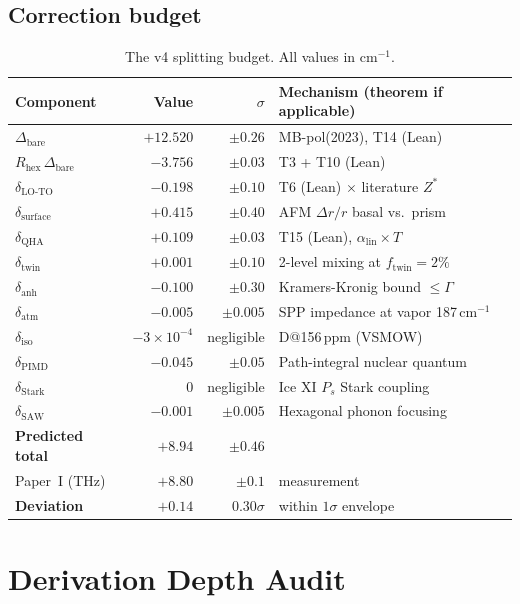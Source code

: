 \documentclass[11pt,a4paper]{article}
\begin{document}
\subsection{Correction budget}

\begin{table}[h]
\centering
\caption{The v4 splitting budget. All values in cm$^{-1}$.}
\label{tab:budget}
\small
\begin{tabular}{lrrl}
\toprule
Component & Value & $\sigma$ & Mechanism (theorem if applicable)\\
\midrule
$\Delta_\text{bare}$ & $+12.520$ & $\pm 0.26$ & MB-pol(2023), T14 (Lean) \\
$R_\text{hex}\,\Delta_\text{bare}$ & $-3.756$ & $\pm 0.03$ & T3 + T10 (Lean) \\
$\delta_\text{LO-TO}$ & $-0.198$ & $\pm 0.10$ & T6 (Lean) $\times$ literature $Z^*$ \\
$\delta_\text{surface}$ & $+0.415$ & $\pm 0.40$ & AFM $\Delta r/r$ basal vs.\ prism \\
$\delta_\text{QHA}$ & $+0.109$ & $\pm 0.03$ & T15 (Lean), $\alpha_\text{lin} \times T$ \\
$\delta_\text{twin}$ & $+0.001$ & $\pm 0.10$ & 2-level mixing at $f_\text{twin}=2\%$ \\
$\delta_\text{anh}$ & $-0.100$ & $\pm 0.30$ & Kramers-Kronig bound $\le \Gamma$ \\
$\delta_\text{atm}$ & $-0.005$ & $\pm 0.005$ & SPP impedance at vapor 187\,cm$^{-1}$ \\
$\delta_\text{iso}$ & $-3 \times 10^{-4}$ & negligible & D@156\,ppm (VSMOW) \\
$\delta_\text{PIMD}$ & $-0.045$ & $\pm 0.05$ & Path-integral nuclear quantum \\
$\delta_\text{Stark}$ & 0 & negligible & Ice XI $P_s$ Stark coupling \\
$\delta_\text{SAW}$ & $-0.001$ & $\pm 0.005$ & Hexagonal phonon focusing \\
\midrule
\textbf{Predicted total} & $\boxed{+8.94}$ & $\boxed{\pm 0.46}$ & \\
Paper~I (THz) & $+8.80$ & $\pm 0.1$ & measurement \\
\textbf{Deviation} & $+0.14$ & $0.30\sigma$ & within $1\sigma$ envelope \\
\bottomrule
\end{tabular}
\end{table}

\section{Derivation Depth Audit}
\label{sec:audit}
\end{document}

